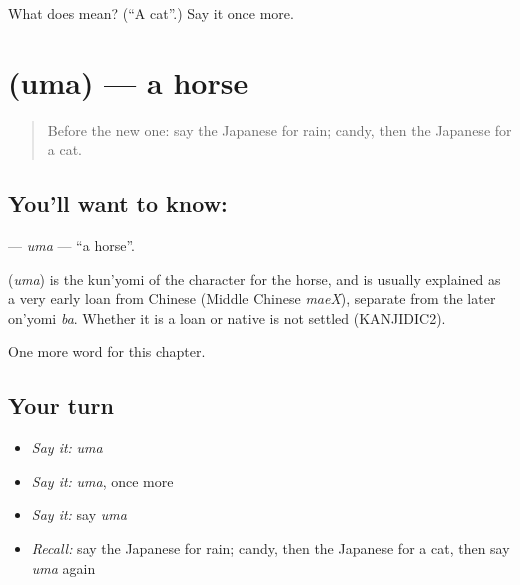 \begin{tcolorbox}[breakable,colback=teal!4,colframe=teal!35!black,title={Before you move on}]
What does  mean? (\textquotedblleft{}A cat\textquotedblright{}.) Say it once more.
\end{tcolorbox}
\section[\texorpdfstring{\ja{うま} (uma)}{うま (uma)}]{ (uma) — a horse}

\label{lesson:JA-C45-uma}



\begin{quote}
Before the new one: say the Japanese for rain; candy, then the Japanese for a cat.
\end{quote}

\subsection*{You'll want to know: }
\textbf{} — \emph{uma} — \textquotedblleft{}a horse\textquotedblright{}.

\begin{cousinweb}
\textbf{} (\emph{uma}) is the kun'yomi of the character for the horse, and is usually explained as a very early loan from Chinese (Middle Chinese \emph{maeX}), separate from the later on'yomi \emph{ba}. Whether it is a loan or native is not settled (KANJIDIC2).
\end{cousinweb}

\begin{grammarlens}[title={What you've built}]
One more word for this chapter.
\end{grammarlens}

\subsection*{Your turn}
\begin{itemize}
\raggedright
  \item \emph{Say it:} \emph{uma}
  \item \emph{Say it:} \emph{uma}, once more
  \item \emph{Say it:} say \emph{uma}
  \item \emph{Recall:} say the Japanese for rain; candy, then the Japanese for a cat, then say \emph{uma} again
\end{itemize}

